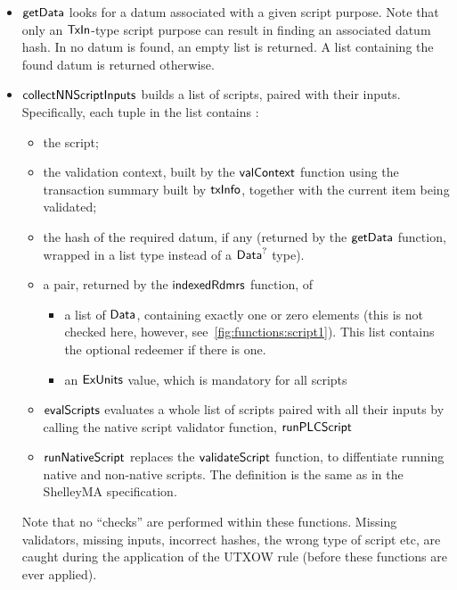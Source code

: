 \begin{itemize}
  \item $\mathsf{getData}$ looks for a datum associated with a given script purpose. Note that
  only an $\mathsf{TxIn}$-type script purpose can result in finding an associated datum hash.
  In no datum is found, an empty list is returned. A list containing the found datum
  is returned otherwise.

  \item $\mathsf{collectNNScriptInputs}$ builds a list of scripts, paired with their
  inputs. Specifically, each tuple in the list contains :

  \begin{itemize}
  \item the script;

  \item the validation context, built by the $\mathsf{valContext}$ function using
  the transaction summary built by $\mathsf{txInfo}$, together with the current item being validated;

  \item the hash of the required datum, if any (returned by the $\mathsf{getData}$ function,
  wrapped in a list type instead of a $\mathsf{Data}^?$ type).

  \item a pair, returned by the $\mathsf{indexedRdmrs}$ function, of
  \begin{itemize}
    \item a list of $\mathsf{Data}$, containing exactly one or zero elements (this
    is not checked here, however, see~\ref{fig:functions:script1}). This list
    contains the optional redeemer if there is one.
    \item an $\mathsf{ExUnits}$ value, which is mandatory for all scripts
  \end{itemize}

  \item $\mathsf{evalScripts}$ evaluates a whole list of scripts paired with all their
  inputs by calling the native script validator function, $\mathsf{runPLCScript}$

  \item $\mathsf{runNativeScript}$ replaces the $\mathsf{validateScript}$ function,
  to diffentiate running native and non-native scripts. The definition is the
  same as in the ShelleyMA specification.
\end{itemize}

Note that no ``checks'' are performed within these functions.
Missing validators, missing inputs, incorrect hashes, the wrong type of script etc,
are caught during the application of the UTXOW rule (before these functions are ever applied).
%

\end{itemize}

